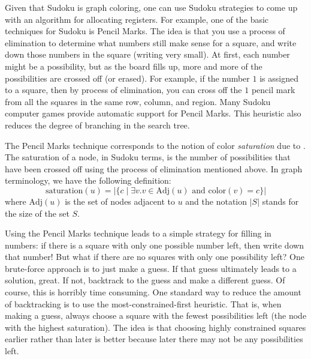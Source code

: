 \documentclass[12pt]{book}
\begin{document}
Given that Sudoku is graph coloring, one can use Sudoku strategies to
come up with an algorithm for allocating registers. For example, one
of the basic techniques for Sudoku is Pencil Marks. The idea is that
you use a process of elimination to determine what numbers still make
sense for a square, and write down those numbers in the square
(writing very small). At first, each number might be a
possibility, but as the board fills up, more and more of the
possibilities are crossed off (or erased). For example, if the number
$1$ is assigned to a square, then by process of elimination, you can
cross off the $1$ pencil mark from all the squares in the same row,
column, and region. Many Sudoku computer games provide automatic
support for Pencil Marks. This heuristic also reduces the degree of
branching in the search tree.

The Pencil Marks technique corresponds to the notion of color
\emph{saturation} due to \cite{Brelaz:1979eu}.  The
saturation of a node, in Sudoku terms, is the number of possibilities
that have been crossed off using the process of elimination mentioned
above. In graph terminology, we have the following definition:
\begin{equation*}
  \mathrm{saturation}(u) = |\{ c \;|\; \exists v. v \in \mathrm{Adj}(u) 
     \text{ and } \mathrm{color}(v) = c \}|
\end{equation*}
where $\mathrm{Adj}(u)$ is the set of nodes adjacent to $u$ and
the notation $|S|$ stands for the size of the set $S$.

Using the Pencil Marks technique leads to a simple strategy for
filling in numbers: if there is a square with only one possible number
left, then write down that number! But what if there are no squares
with only one possibility left? One brute-force approach is to just
make a guess. If that guess ultimately leads to a solution, great.  If
not, backtrack to the guess and make a different guess.  Of course,
this is horribly time consuming. One standard way to reduce the amount
of backtracking is to use the most-constrained-first heuristic. That
is, when making a guess, always choose a square with the fewest
possibilities left (the node with the highest saturation).  The idea
is that choosing highly constrained squares earlier rather than later
is better because later there may not be any possibilities left.
\end{document}
